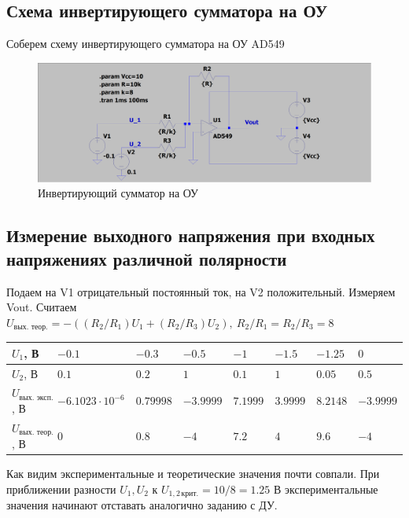 \documentclass[a4paper, 12pt]{article}
\begin{document}
    \subsection{Схема инвертирующего сумматора на ОУ}
    Соберем схему инвертирующего сумматора на ОУ AD549
    \begin{figure}[H]
        \centering
        \includegraphics[scale=0.22]{scheme4.png}
        \captionsetup{skip=0pt}
        \caption{Инвертирующий сумматор на ОУ}
        \label{fig:scheme4}
    \end{figure}

    
    \subsection{Измерение выходного напряжения при входных напряжениях различной полярности}
    Подаем на V1 отрицательный постоянный ток, на V2 положительный. Измеряем Vout. Считаем
    $U_{\text{вых. теор.}}=-\left( \left(R_2/R_1\right)U_1+\left(R_2/R_3\right)U_2 \right),\ R_2/R_1=R_2/R_3=8$
    \begin{center}
        \begin{tabular}{ | m{5.5em} | m{4em}| m{3.5em} | m{4em} | m{3em} | m{3em} | m{3em} | m{4em} | } 
        \hline
        $U_1$, В& $-0.1$ &$-0.3$ &$-0.5$ &$-1$& $-1.5$ & $-1.25$ &$0$\\ 
        \hline
        $U_2$, В& $0.1$ &$0.2$ &$1$ &$0.1$& $1$ & $0.05$ &$0.5$\\ 
        \hline
        $U_{\text{вых. эксп.}}$, В& $-6.1023\cdot10^{-6}$ &$0.79998$ &$-3.9999$ &$7.1999$& $3.9999$ & $8.2148$ &$-3.9999$\\
        \hline
        $U_{\text{вых. теор.}}$, В& $0$ &$0.8$ &$-4$ &$7.2$& $4$ & $9.6$ &$-4$\\
        \hline
        \end{tabular}
    \end{center}
    Как видим экспериментальные и теоретические значения почти совпали.
    При приближении разности $U_1,U_2$ к $U_{1,2\,\text{крит.}}=10/8=1.25$ В
    экспериментальные значения начинают отставать аналогично заданию с ДУ.
\end{document}

